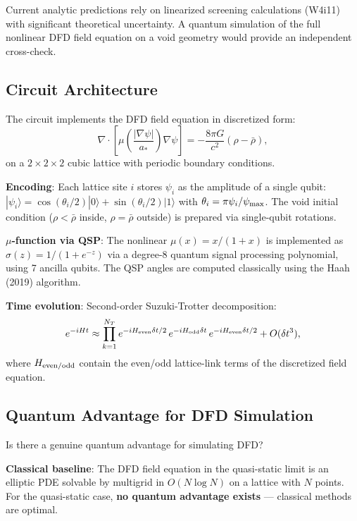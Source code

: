 \documentclass[11pt]{article}
\theoremstyle{definition}
\theoremstyle{remark}
\begin{document}
Current analytic predictions rely on linearized screening calculations
(W4i11) with significant theoretical uncertainty.  A quantum simulation
of the full nonlinear DFD field equation on a void geometry would provide
an independent cross-check.

\subsection{Circuit Architecture}
\label{sec:circuit-architecture}

The circuit implements the DFD field equation in discretized form:
\begin{equation}
  \nabla \cdot \left[\mu\!\left(\frac{|\nabla\psi|}{a_*}\right)
  \nabla\psi\right] = -\frac{8\pi G}{c^2}(\rho - \bar{\rho}),
\end{equation}
on a $2 \times 2 \times 2$ cubic lattice with periodic boundary conditions.

\textbf{Encoding}: Each lattice site $i$ stores $\psi_i$ as the amplitude
of a single qubit: $|\psi_i\rangle = \cos(\theta_i/2)|0\rangle +
\sin(\theta_i/2)|1\rangle$ with $\theta_i = \pi\psi_i/\psi_{\rm max}$.
The void initial condition ($\rho < \bar{\rho}$ inside, $\rho = \bar{\rho}$
outside) is prepared via single-qubit rotations.

\textbf{$\mu$-function via QSP}: The nonlinear $\mu(x) = x/(1+x)$
is implemented as $\sigma(z) = 1/(1 + e^{-z})$ via a degree-8
quantum signal processing polynomial, using 7 ancilla qubits.  The
QSP angles are computed classically using the Haah (2019) algorithm.

\textbf{Time evolution}: Second-order Suzuki-Trotter decomposition:
\begin{equation}
  e^{-iHt} \approx \prod_{k=1}^{N_T}
  e^{-iH_{\rm even}\delta t/2}\,e^{-iH_{\rm odd}\delta t}\,
  e^{-iH_{\rm even}\delta t/2} + O(\delta t^3),
\end{equation}
where $H_{\rm even/odd}$ contain the even/odd lattice-link terms of
the discretized field equation.

\subsection{Quantum Advantage for DFD Simulation}
\label{sec:quantum-advantage-dfd}

Is there a genuine quantum advantage for simulating DFD?

\textbf{Classical baseline}: The DFD field equation in the quasi-static
limit is an elliptic PDE solvable by multigrid in $O(N \log N)$ on a
lattice with $N$ points.  For the quasi-static case,
\textbf{no quantum advantage exists} --- classical methods are optimal.
\end{document}
